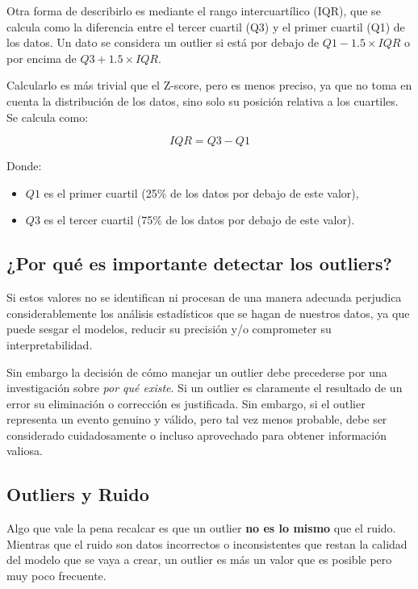 Otra forma de describirlo es mediante el rango intercuartílico (IQR),
que se calcula como la diferencia entre el tercer cuartil (Q3) y el
primer cuartil (Q1) de los datos. Un dato se considera un outlier si
está por debajo de \(Q1 - 1.5 \times IQR\) o por encima de
\(Q3 + 1.5 \times IQR\).

Calcularlo es más trivial que el Z-score, pero es menos preciso, ya que
no toma en cuenta la distribución de los datos, sino solo su posición
relativa a los cuartiles. Se calcula como:

\[IQR = Q3 - Q1\]

Donde:

\begin{itemize}
\item
  \(Q1\) es el primer cuartil (25\% de los datos por debajo de este
  valor),
\item
  \(Q3\) es el tercer cuartil (75\% de los datos por debajo de este
  valor).
\end{itemize}

\subsection{¿Por qué es importante detectar los outliers?}

Si estos valores no se identifican ni procesan de una manera adecuada
perjudica considerablemente los análisis estadísticos que se hagan de
nuestros datos, ya que puede sesgar el modelos, reducir su precisión y/o
comprometer su interpretabilidad.

Sin embargo la decisión de cómo manejar un outlier debe precederse por
una investigación sobre \emph{por qué existe}. Si un outlier es
claramente el resultado de un error su eliminación o corrección es
justificada. Sin embargo, si el outlier representa un evento genuino y
válido, pero tal vez menos probable, debe ser considerado cuidadosamente
o incluso aprovechado para obtener información valiosa. \cite{Pontia_2026}

\subsection{Outliers y Ruido}

Algo que vale la pena recalcar es que un outlier \textbf{no es lo mismo}
que el ruido. Mientras que el ruido son datos incorrectos o
inconsistentes que restan la calidad del modelo que se vaya a crear, un
outlier es más un valor que es posible pero muy poco frecuente.

